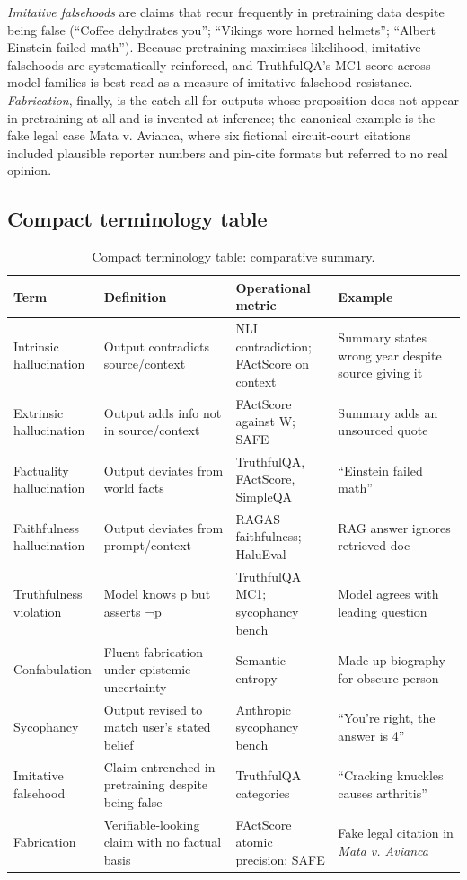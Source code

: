 \documentclass{article}
\begin{document}
\emph{Imitative falsehoods} \citep{lin2022truthfulqameasurin} are claims that recur frequently in pretraining data despite being false (``Coffee dehydrates you''; ``Vikings wore horned helmets''; ``Albert Einstein failed math''). Because pretraining maximises likelihood, imitative falsehoods are systematically reinforced, and TruthfulQA's MC1 score across model families is best read as a measure of imitative-falsehood resistance. \emph{Fabrication}, finally, is the catch-all for outputs whose proposition does not appear in pretraining at all and is invented at inference; the canonical example is the fake legal case Mata v. Avianca, where six fictional circuit-court citations included plausible reporter numbers and pin-cite formats but referred to no real opinion.

\subsection{Compact terminology table}\label{compact-terminology-table}

\begin{table}[t]
\centering
\caption{Compact terminology table: comparative summary.}
\label{tab:compact-terminology-table}
\begin{tabular}{>{\raggedright\arraybackslash}p{0.1566\linewidth}
  >{\raggedright\arraybackslash}p{0.3072\linewidth}
  >{\raggedright\arraybackslash}p{0.2349\linewidth}
  >{\raggedright\arraybackslash}p{0.3012\linewidth}}
\toprule
Term & Definition & Operational metric & Example \\
\midrule
Intrinsic hallucination & Output contradicts source/context & NLI contradiction; FActScore on context & Summary states wrong year despite source giving it \\
Extrinsic hallucination & Output adds info not in source/context & FActScore against W; SAFE & Summary adds an unsourced quote \\
Factuality hallucination & Output deviates from world facts & TruthfulQA, FActScore, SimpleQA & ``Einstein failed math'' \\
Faithfulness hallucination & Output deviates from prompt/context & RAGAS faithfulness; HaluEval & RAG answer ignores retrieved doc \\
Truthfulness violation & Model knows p but asserts ¬p & TruthfulQA MC1; sycophancy bench & Model agrees with leading question \\
Confabulation & Fluent fabrication under epistemic uncertainty & Semantic entropy \citep{farquhar2024detectinghallucina} & Made-up biography for obscure person \\
Sycophancy & Output revised to match user's stated belief & Anthropic sycophancy bench & ``You're right, the answer is 4'' \\
Imitative falsehood & Claim entrenched in pretraining despite being false & TruthfulQA categories & ``Cracking knuckles causes arthritis'' \\
Fabrication & Verifiable-looking claim with no factual basis & FActScore atomic precision; SAFE & Fake legal citation in \emph{Mata v. Avianca} \\
\end{tabular}
\end{table}
\end{document}
